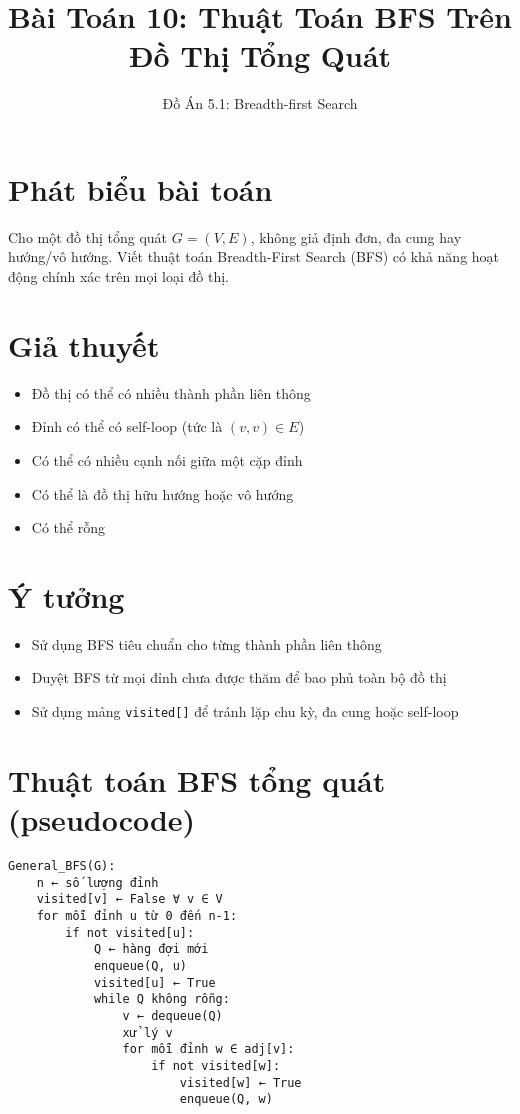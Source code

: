 \documentclass[12pt]{article}
\title{Bài Toán 10: Thuật Toán BFS Trên Đồ Thị Tổng Quát}
\author{Đồ Án 5.1: Breadth-first Search}
\date{}
\begin{document}
\maketitle

\section*{Phát biểu bài toán}
Cho một đồ thị tổng quát $G = (V, E)$, không giả định đơn, đa cung hay hướng/vô hướng.  
Viết thuật toán Breadth-First Search (BFS) có khả năng hoạt động chính xác trên mọi loại đồ thị.

\section*{Giả thuyết}
\begin{itemize}
    \item Đồ thị có thể có nhiều thành phần liên thông
    \item Đỉnh có thể có self-loop (tức là $(v,v) \in E$)
    \item Có thể có nhiều cạnh nối giữa một cặp đỉnh
    \item Có thể là đồ thị hữu hướng hoặc vô hướng
    \item Có thể rỗng
\end{itemize}

\section*{Ý tưởng}
\begin{itemize}
    \item Sử dụng BFS tiêu chuẩn cho từng thành phần liên thông
    \item Duyệt BFS từ mọi đỉnh chưa được thăm để bao phủ toàn bộ đồ thị
    \item Sử dụng mảng \texttt{visited[]} để tránh lặp chu kỳ, đa cung hoặc self-loop
\end{itemize}

\section*{Thuật toán BFS tổng quát (pseudocode)}
\begin{verbatim}
General_BFS(G):
    n ← số lượng đỉnh
    visited[v] ← False ∀ v ∈ V
    for mỗi đỉnh u từ 0 đến n-1:
        if not visited[u]:
            Q ← hàng đợi mới
            enqueue(Q, u)
            visited[u] ← True
            while Q không rỗng:
                v ← dequeue(Q)
                xử lý v
                for mỗi đỉnh w ∈ adj[v]:
                    if not visited[w]:
                        visited[w] ← True
                        enqueue(Q, w)
\end{verbatim}
\end{document}
